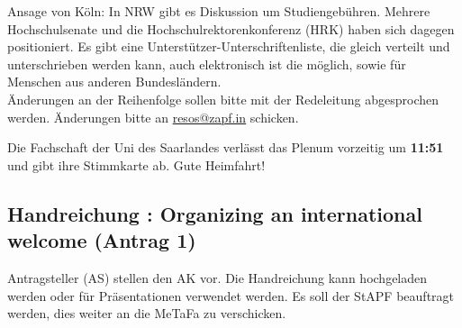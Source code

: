     Ansage von Köln: In NRW gibt es Diskussion um Studiengebühren. Mehrere Hochschulsenate und die Hochschulrektorenkonferenz (HRK) haben sich dagegen positioniert. Es gibt eine Unterstützer-Unterschriftenliste, die gleich verteilt und unterschrieben werden kann, auch elektronisch ist die möglich, sowie für Menschen aus anderen Bundesländern. \\

    Änderungen an der Reihenfolge sollen bitte mit der Redeleitung abgesprochen werden. Änderungen bitte an \url{resos@zapf.in} schicken.

    \begin{info}{}
      Die Fachschaft der Uni des Saarlandes verlässt das Plenum vorzeitig um \textbf{11:51} und gibt ihre Stimmkarte ab. Gute Heimfahrt!
    \end{info}

  \subsection{Handreichung : Organizing an international welcome (Antrag 1)}
    Antragsteller (AS) stellen den AK vor. Die Handreichung kann hochgeladen werden oder für Präsentationen verwendet werden. Es soll der StAPF beauftragt werden, dies weiter an die MeTaFa zu verschicken.

